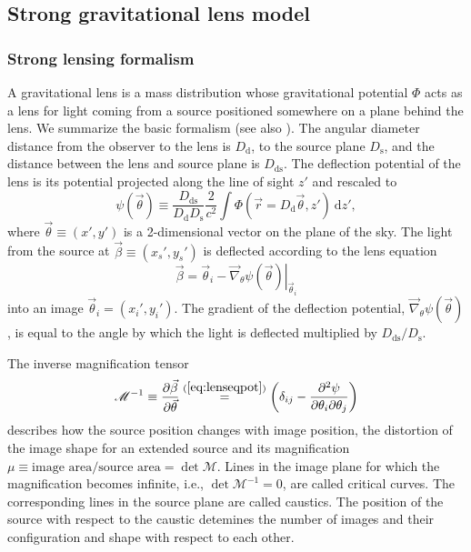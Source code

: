 \documentclass[useAMS,usenatbib]{mnras}
\newcommand{\vect}[1]{\vec{#1}} %
\begin{document}
\subsection{Strong gravitational lens model} \label{sec:lensing_theo}

\subsubsection{Strong lensing formalism}

A gravitational lens is a mass distribution whose gravitational potential $\Phi$ acts as a lens for light coming from a source positioned somewhere on a plane behind the lens. We summarize the basic formalism (see also \citealt{1992grle.book.....S,1996astro.ph..6001N,2006glsw.conf....1S,2006glsw.conf...91K,2010ARA&A..48...87T}). The angular diameter distance from the observer to the lens is $D_\text{d}$, to the source plane $D_\text{s}$, and the distance between the lens and source plane is $D_\text{ds}$. The deflection potential of the lens is its potential projected along the line of sight $z'$ and rescaled to
\begin{equation}
\psi(\vect{\theta}) \equiv \frac{D_\text{ds}}{D_\text{d} D_\text{s}} \frac{2}{c^2} \int \Phi(\vect{r}=D_\text{d} \vect{\theta},z') {\ \mathrm d} z', \label{eq:psidef}
\end{equation}
where $\vect{\theta}\equiv(x',y')$ is a 2-dimensional vector on the plane of the sky. The light from the source at $\vect{\beta} \equiv (x_s',y_s')$ is deflected according to the lens equation
\begin{equation}
\vect{\beta} = \vect{\theta}_i - \left.\vect{\nabla}_\theta \psi(\vect{\theta})\right|_{\vect{\theta}_i} \label{eq:lenseqpot}
\end{equation}
into an image $\vect{\theta}_i = (x_i',y_i')$. The gradient of the deflection potential, $\vect{\nabla}_\theta \psi(\vect{\theta})$, is equal to the angle by which the light is deflected multiplied by $D_\text{ds}/D_\text{s}$.

The inverse magnification tensor
\begin{equation}
\mathscr{M}^{-1} \equiv \frac{\partial \vect{\beta}}{\partial \vect{\theta}} \overset{(\ref{eq:lenseqpot})}{=} \left(\delta_{ij} - \frac{\partial^2 \psi}{\partial \theta_i \partial \theta_j} \right)\label{eq:magnificationtensor}
\end{equation}
describes how the source position changes with image position, the distortion of the image shape for an extended source and its magnification $\mu \equiv \text{image area}/\text{source area} = \det \mathscr{M}$. Lines in the image plane for which the magnification becomes infinite, i.e., $\det \mathscr{M}^{-1} = 0$, are called critical curves. The corresponding lines in the source plane are called caustics. The position of the source with respect to the caustic detemines the number of images and their configuration and shape with respect to each other.
\end{document}

